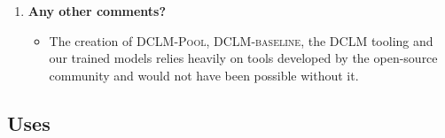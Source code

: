 \documentclass{article}
\newcommand{\dclm}{\textsc{DCLM}\xspace}
\newcommand{\rawpool}{\textsc{DCLM-Pool}\xspace}
\newcommand{\hqpool}{\textsc{DCLM-baseline}\xspace}
\begin{document}
\begin{enumerate}[label=Q\arabic*, resume]
\begin{itemize}
\begin{itemize}
\end{itemize}
For a more complete list of software and associated licenses, please refer to .
\end{itemize}



\item \textbf{Any other comments?}


\begin{itemize}
\item The creation of \rawpool, \hqpool, the \dclm tooling and our trained models relies heavily on tools developed by the open-source community and would not have been possible without it.
\end{itemize}

\end{enumerate}

\subsection{Uses}
\end{document}
